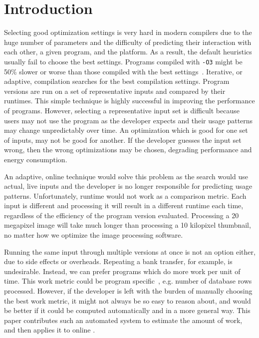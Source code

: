 \section{Introduction}

    Selecting good optimization settings is very hard in modern compilers due to the huge number of parameters and the difficulty of
    predicting their interaction with each other, a given program, and the platform. As a result, the default heuristics usually fail to
    choose the best settings. Programs compiled with \texttt{-O3} might be 50\% slower or worse than those compiled with the best
    settings~\cite{fursin07,chen12b}. Iterative, or adaptive, compilation searches for the best compilation settings. Program versions are
    run on a set of representative inputs and compared by their runtimes. This simple technique is highly successful in improving the
    performance of programs. However, selecting a representative input set is difficult because users may not use the program as the
    developer expects and their usage patterns may change unpredictably over time. An optimization which is good for one set of inputs, may
    not be good for another. If the developer guesses the input set wrong, then the wrong optimizations may be chosen, degrading
    performance and energy consumption.

    An adaptive, online technique would solve this problem as the search would use actual, live inputs and the developer is no longer
    responsible for predicting usage patterns. Unfortunately, runtime would not work as a comparison metric. Each input is different and 
    processing it will result in a different runtime each time, regardless of the efficiency of the program version evaluated. Processing
    a 20 megapixel image will take much longer than processing a 10 kilopixel thumbnail, no matter how we optimize the image processing
    software.
    
    Running the same input
    through multiple versions at once is not an option either, due to side effects or overheads. Repeating a bank transfer, for example,
    is undesirable. Instead, we can prefer programs which do more work per unit of time. This work metric could be program
    specific~\cite{alameldeen06,coppa14}, e.g. number of database rows processed. However, if the developer is left with the burden of
    manually choosing the best work metric, it might not always be so easy to reason about, and would be better if it could be computed
    automatically and in a more general way. This paper contributes such an automated system to estimate the amount of work, and then
    applies it to online {\itercomp}.


